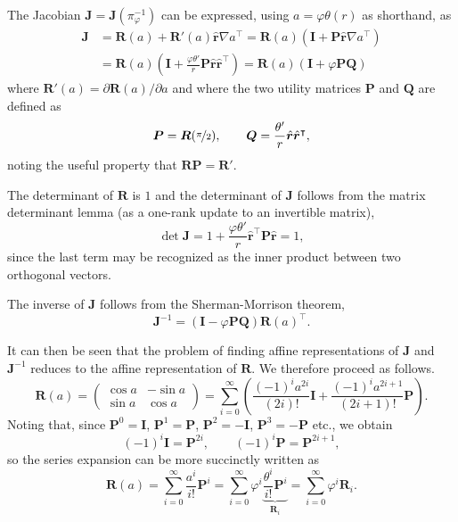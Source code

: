 \documentclass[onecolumn, twoside, a4paper, 11pt]{article}
\begin{document}
The Jacobian $\bm J = \bm J(\pi_{\varphi}^{-1})$ can be expressed,
using $a = \varphi \theta(r)$ as shorthand, as
\begin{align}
  \nonumber
  \bm J &= \bm R(a) + \bm R'(a) \hat{\bm r} \nabla a^\intercal
  = \bm R(a) \left( \bm I + \bm P \hat{\bm r} \nabla a^\intercal \right) \\
  &= \bm R(a) \left(
    \bm I + \frac{\varphi \theta'}{r} \bm P \hat{\bm r} \hat{\bm r}^\intercal
  \right)
  = \bm R(a) \left( \bm I + \varphi \bm P \bm Q \right)
\end{align}
where $\bm R'(a) = \partial \bm R(a) / \partial a$ and
where the two utility matrices $\bm P$ and $\bm Q$ are defined as
\begin{equation}
  \bm P = \bm R(\nicefrac{\pi}{2}), \qquad
  \bm Q = \frac{\theta'}{r} \hat{\bm r} \hat{\bm r}^\intercal,
\end{equation}
noting the useful property that $\bm R \bm P = \bm R'$.

The determinant of $\bm R$ is $1$ and the determinant of $\bm J$ follows
from the matrix determinant lemma (as a one-rank update to an invertible
matrix),
\[
  \det \bm J = 1 + \frac{\varphi\theta'}{r} \hat{\bm r}^\intercal \bm P \hat{\bm r} = 1,
\]
since the last term may be recognized as the inner product between two
orthogonal vectors.

The inverse of $\bm J$ follows from the Sherman-Morrison theorem,
\[
  \bm J^{-1} = \left( \bm I - \varphi \bm P \bm Q \right)
  \bm R(a)^\intercal.
\]

It can then be seen that the problem of finding affine representations of
$\bm J$ and $\bm J^{-1}$ reduces to the affine representation of $\bm R$.
We therefore proceed as follows.
\[
  \bm R(a)
  = \begin{pmatrix} \cos a & -\sin a \\ \sin a & \cos a \end{pmatrix}
  = \sum_{i=0}^\infty \left( \frac{(-1)^i a^{2i}}{(2i)!} \bm I
    + \frac{(-1)^i a^{2i+1}}{(2i+1)!} \bm P \right).
\]
Noting that, since $\bm P^0 = \bm I$, $\bm P^1 = \bm P$, $\bm P^2 = -\bm I$,
$\bm P^3 = -\bm P$ etc., we obtain
\[
  (-1)^i \bm I = \bm P^{2i}, \qquad (-1)^i \bm P = \bm P^{2i+1},
\]
so the series expansion can be more succinctly written as
\begin{equation}
  \label{eqn:rotsum}
  \bm R(a) = \sum_{i=0}^\infty \frac{a^i}{i!} \bm P^i
  = \sum_{i=0}^\infty \varphi^i \underbrace{\frac{\theta^i}{i!}\bm P^i}_{\bm R_i}
  = \sum_{i=0}^\infty \varphi^i \bm R_i.
\end{equation}
\end{document}
